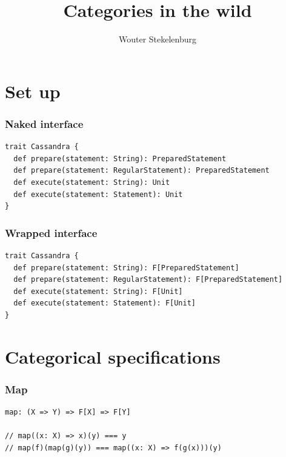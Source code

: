 \documentclass{beamer}
\title{Categories in the wild}
\author{Wouter Stekelenburg}
\newcommand\hide[1]{}
\begin{document}
\lstset{style=Scala}

\begin{frame}
  \titlepage
\end{frame}

\hide{
\begin{frame}
\frametitle{Categories are like \dots}
Categories are like cats. It is easy to learn what they are, but that doesn't mean you understand them or can work with them without getting hurt.
\end{frame}
}

\section{Set up}
\begin{frame}[fragile]
\frametitle{Naked interface}

\begin{lstlisting}
trait Cassandra {
  def prepare(statement: String): PreparedStatement
  def prepare(statement: RegularStatement): PreparedStatement
  def execute(statement: String): Unit
  def execute(statement: Statement): Unit
}
\end{lstlisting}

\end{frame}

\begin{frame}[fragile]
\frametitle{Wrapped interface}

\begin{lstlisting}
trait Cassandra {
  def prepare(statement: String): F[PreparedStatement]
  def prepare(statement: RegularStatement): F[PreparedStatement]
  def execute(statement: String): F[Unit]
  def execute(statement: Statement): F[Unit]
}
\end{lstlisting}

\end{frame}

\section{Categorical specifications}

\begin{frame}[fragile]
\frametitle{Map}
\begin{lstlisting}
map: (X => Y) => F[X] => F[Y]

// map((x: X) => x)(y) === y
// map(f)(map(g)(y)) === map((x: X) => f(g(x)))(y)
\end{lstlisting}
\end{frame}
\end{document}
